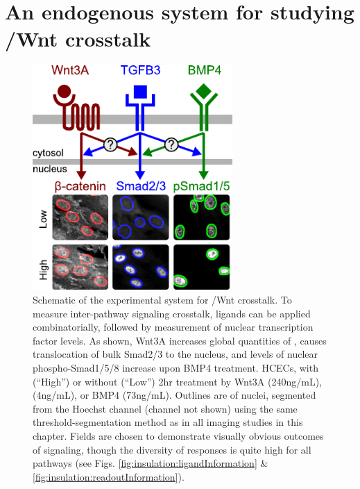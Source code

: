 \section[Experimental system for \tgfbsf/Wnt integration]{An endogenous system for studying \tgfbsf/Wnt crosstalk}
\label{insulation:system}




  \begin{figure}[!bt]
  \centering
  \includegraphics[width=3in]{FIGS/insulation/schematic.pdf}
  {\singlespacing 
  \caption[Schematic of the experimental system for \tgfbsf/Wnt crosstalk.]
        {Schematic of the experimental system for \tgfbsf/Wnt
         crosstalk. To measure inter-pathway signaling crosstalk,
         ligands can be applied combinatorially, followed
         by measurement of nuclear transcription
         factor levels. As shown, Wnt3A increases global
         quantities of \bcat,  causes translocation
         of bulk Smad2/3 to the nucleus, and levels of nuclear
         phospho-Smad1/5/8 increase upon BMP4 treatment.
         HCECs, with (``High'') or without (``Low'') 2hr treatment by
         Wnt3A (240ng/mL),  (4ng/mL), or BMP4 (73ng/mL).
         Outlines are of nuclei, segmented from the Hoechst channel
         (channel not shown) using the same threshold-segmentation method
         as in all imaging studies in this chapter.
         Fields are chosen to demonstrate visually obvious
         outcomes of signaling, though the diversity of responses
         is quite high for all pathways
         (see Figs. \ref{fig:insulation:ligandInformation} \&
         \ref{fig:insulation:readoutInformation}).}
  \label{fig:insulation:schematic}}
  \end{figure}
  


